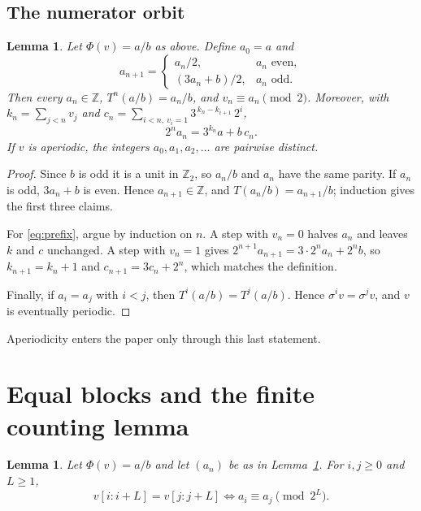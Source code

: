 \documentclass[11pt]{amsart}
\newtheorem{lemma}[theorem]{Lemma}
\theoremstyle{definition}
\theoremstyle{remark}
\newcommand{\Z}{\mathbb{Z}}
\begin{document}
\subsection*{The numerator orbit}

\begin{lemma}\label{lem:orbit}
Let $\Phi(v)=a/b$ as above. Define $a_0=a$ and
\[
a_{n+1}=\begin{cases} a_n/2, & a_n \text{ even},\\ (3a_n+b)/2, & a_n\text{ odd}.\end{cases}
\]
Then every $a_n\in\Z$, $T^n(a/b)=a_n/b$, and $v_n\equiv a_n\pmod 2$. Moreover, with $k_n=\sum_{j<n}v_j$ and $c_n=\sum_{i<n,\ v_i=1}3^{\,k_n-k_{i+1}}\,2^{i}$,
\begin{equation}\label{eq:prefix}
2^n a_n=3^{k_n}a+b\,c_n .
\end{equation}
If $v$ is aperiodic, the integers $a_0,a_1,a_2,\dots$ are pairwise distinct.
\end{lemma}

\begin{proof}
Since $b$ is odd it is a unit in $\Z_2$, so $a_n/b$ and $a_n$ have the same parity. If $a_n$ is odd, $3a_n+b$ is even. Hence $a_{n+1}\in\Z$, and $T(a_n/b)=a_{n+1}/b$; induction gives the first three claims.

For \eqref{eq:prefix}, argue by induction on $n$. A step with $v_n=0$ halves $a_n$ and leaves $k$ and $c$ unchanged. A step with $v_n=1$ gives $2^{n+1}a_{n+1}=3\cdot 2^n a_n+2^n b$, so $k_{n+1}=k_n+1$ and $c_{n+1}=3c_n+2^n$, which matches the definition.

Finally, if $a_i=a_j$ with $i<j$, then $T^i(a/b)=T^j(a/b)$. Hence $\sigma^iv=\sigma^jv$, and $v$ is eventually periodic.
\end{proof}

Aperiodicity enters the paper only through this last statement.

\section{Equal blocks and the finite counting lemma}\label{sec:counting}

\begin{lemma}\label{lem:blocks}
Let $\Phi(v)=a/b$ and let $(a_n)$ be as in Lemma~\ref{lem:orbit}. For $i,j\ge0$ and $L\ge1$,
\[
v[i:i+L]=v[j:j+L]\iff a_i\equiv a_j \pmod{2^L}.
\]
\end{lemma}
\end{document}
